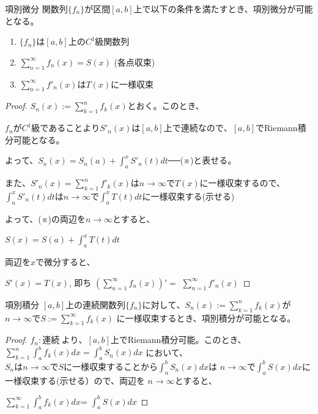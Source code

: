 \documentclass[twocolumn,fleqn]{jsarticle}
\begin{document}
\begin{itembox}[l]{項別微分}
関数列$\{f_n\}が区間[a,b]$上で以下の条件を満たすとき、項別微分が可能となる。
\begin{enumerate}
\item $\{f_n\}は[a,b]上のC^1級関数列$
\item $\displaystyle \sum_{n=1}^{\infty} f_n(x) = S(x)$ (各点収束)
\item $\displaystyle \sum_{n=1}^{\infty} f'_n(x)はT(x)$に一様収束
\end{enumerate}
\end{itembox}
\begin{proof}
$S_n(x):=\displaystyle \sum_{k=1}^{n} f_k(x)$とおく。このとき、

$f_nがC^1級であることよりS'_n(x)は[a,b]上で連続なので、[a,b]で$Riemann積分可能となる。

よって、$S_n(x)=S_n(a)+\displaystyle \int_a^x S'_n(t) dt$──(※)と表せる。

また、$S'_n(x)=\displaystyle \sum_{k=1}^{n} f'_k(x)はn \to {\infty}でT(x)$に一様収束するので、
$\displaystyle \int_a^x S'_n(t) dt はn \to {\infty}で\displaystyle \int_a^x T(t) dt$に一様収束する(示せる)

よって、(※)の両辺を$n \to {\infty}$とすると、

\bigskip

$S(x) = S(a) + \displaystyle \int_a^x T(t) dt$

\bigskip

両辺を$x$で微分すると、

$S'(x) = T(x)$, 即ち $(\displaystyle \sum_{n=1}^{\infty} f_n(x))'=$
$\displaystyle \sum_{n=1}^{\infty} f'_n(x)$
\end{proof}

\begin{itembox}[l]{項別積分}
$[a,b]上の連続関数列\{f_n\}に対して、S_n(x):=\displaystyle \sum_{k=1}^{n} f_k(x)が$
$n \to {\infty}でS:=\displaystyle \sum_{k=1}^{\infty} f_k(x)$ に一様収束するとき、項別積分が可能となる。
\end{itembox}

\begin{proof}
$f_n:連続 \ より、[a,b]$上でRiemann積分可能。このとき、
$\displaystyle \sum_{k=1}^{n} \displaystyle \int_a^b f_k(x) dx=\displaystyle \int_a^b S_n(x) dx$
において、$S_nはn \to {\infty}でSに一様収束することから\displaystyle \int_a^b S_n(x) dx$は
$n \to {\infty}で\displaystyle \int_a^b S(x) dx$に一様収束する(示せる）ので、両辺を
$n \to {\infty}$とすると、

$\displaystyle \sum_{k=1}^{\infty} \displaystyle \int_a^b f_k(x) dx$=
$\displaystyle \int_a^b S(x) dx$
\end{proof}
\end{document}
